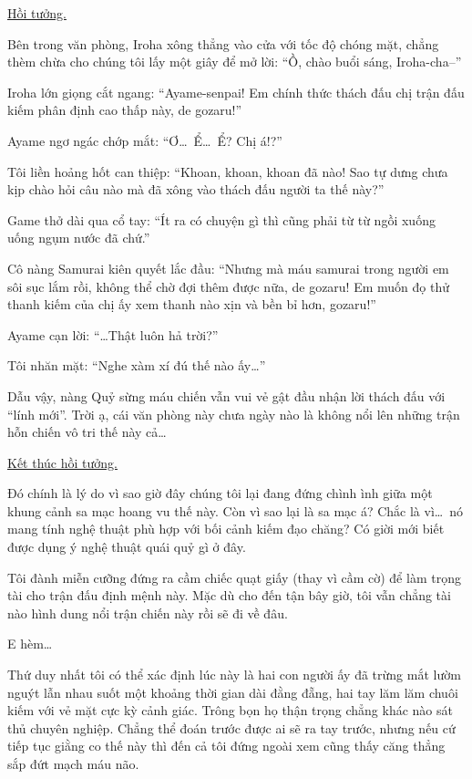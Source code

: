 \documentclass[../main.tex]{subfiles}
\begin{document}
\begin{center}
    \uline{Hồi tưởng.}
\end{center}

Bên trong văn phòng, Iroha xông thẳng vào cửa với tốc độ chóng mặt, chẳng thèm chừa cho chúng tôi lấy một giây để mở lời: ``Ồ, chào buổi sáng, Iroha-cha--''

Iroha lớn giọng cắt ngang: ``Ayame-senpai! Em chính thức thách đấu chị trận đấu kiếm phân định cao thấp này, de gozaru!''

Ayame ngơ ngác chớp mắt: ``Ơ\dots\ Ể\dots\ Ể? Chị á!?''

Tôi liền hoảng hốt can thiệp: ``Khoan, khoan, khoan đã nào! Sao tự dưng chưa kịp chào hỏi câu nào mà đã xông vào thách đấu người ta thế này?''

Game thở dài qua cổ tay: ``Ít ra có chuyện gì thì cũng phải từ từ ngồi xuống uống ngụm nước đã chứ.''

Cô nàng Samurai kiên quyết lắc đầu: ``Nhưng mà máu samurai trong người em sôi sục lắm rồi, không thể chờ đợi thêm được nữa, de gozaru! Em muốn đọ thử thanh kiếm của chị ấy xem thanh nào xịn và bền bỉ hơn, gozaru!''

Ayame cạn lời: ``\dots Thật luôn hả trời?''

Tôi nhăn mặt: ``Nghe xàm xí đú thế nào ấy\dots''

Dẫu vậy, nàng Quỷ sừng máu chiến vẫn vui vẻ gật đầu nhận lời thách đấu với ``lính mới''. Trời ạ, cái văn phòng này chưa ngày nào là không nổi lên những trận hỗn chiến vô tri thế này cả\dots

\begin{center}
    \uline{Kết thúc hồi tưởng.}
\end{center}

Đó chính là lý do vì sao giờ đây chúng tôi lại đang đứng chình ình giữa một khung cảnh sa mạc hoang vu thế này. Còn vì sao lại là sa mạc á? Chắc là vì\dots\ nó mang tính nghệ thuật phù hợp với bối cảnh kiếm đạo chăng? Có giời mới biết được dụng ý nghệ thuật quái quỷ gì ở đây.

Tôi đành miễn cưỡng đứng ra cầm chiếc quạt giấy (thay vì cầm cờ) để làm trọng tài cho trận đấu định mệnh này. Mặc dù cho đến tận bây giờ, tôi vẫn chẳng tài nào hình dung nổi trận chiến này rồi sẽ đi về đâu.

E hèm\dots

Thứ duy nhất tôi có thể xác định lúc này là hai con người ấy đã trừng mắt lườm nguýt lẫn nhau suốt một khoảng thời gian dài đằng đẵng, hai tay lăm lăm chuôi kiếm với vẻ mặt cực kỳ cảnh giác. Trông bọn họ thận trọng chẳng khác nào sát thủ chuyên nghiệp. Chẳng thể đoán trước được ai sẽ ra tay trước, nhưng nếu cứ tiếp tục giằng co thế này thì đến cả tôi đứng ngoài xem cũng thấy căng thẳng sắp đứt mạch máu não.
\end{document}
